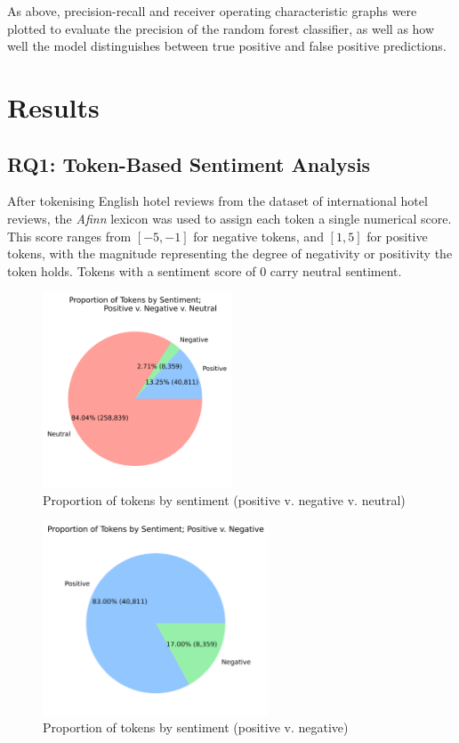 \documentclass[12pt, bibliography=totocnumbered, paper=a4]{scrartcl}
\def\it#1{\textit{#1}}
\begin{document}
As above, precision-recall and receiver operating characteristic
graphs were plotted to evaluate the precision of the random forest
classifier, as well as how well the model distinguishes between true
positive and false positive predictions.

\section{Results}
\subsection{RQ1: Token-Based Sentiment Analysis}
After tokenising English hotel reviews from the dataset of international hotel reviews,
the \it{Afinn} lexicon was used to assign each token a single numerical score. This
score ranges from \([-5, -1]\) for negative tokens, and \([1, 5]\) for positive tokens,
with the magnitude representing the degree of negativity or positivity the token holds.
Tokens with a sentiment score of \(0\) carry neutral sentiment.

\begin{figure}[htpb]
	\begin{center}
		\includegraphics[width=0.5\textwidth]{rq1/pie_tripartite.png}
	\end{center}
	\caption{Proportion of tokens by sentiment (positive v. negative v. neutral)}
	\label{fig:reviews-pie1}
\end{figure}

\begin{figure}[htpb]
	\begin{center}
		\includegraphics[width=0.6\textwidth]{rq1/pie_bipartite.png}
	\end{center}
	\caption{Proportion of tokens by sentiment (positive v. negative)}
	\label{fig:reviews-pie2}
\end{figure}
\end{document}
